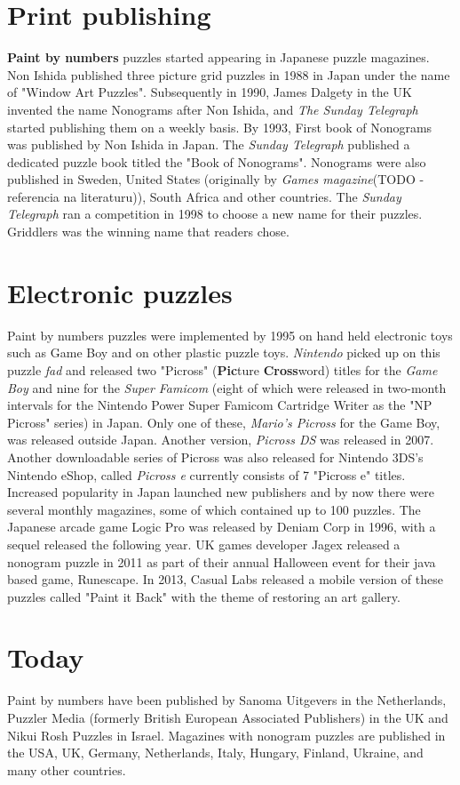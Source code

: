 \section{Print publishing}
\textbf{Paint by numbers} puzzles started appearing in Japanese puzzle magazines. Non Ishida published three picture grid puzzles in 1988 in Japan under the name of "Window Art Puzzles". Subsequently in 1990, James Dalgety in the UK invented the name Nonograms after Non Ishida, and \textit{\textit{The Sunday Telegraph}} started publishing them on a weekly basis. By 1993, First book of Nonograms was published by Non Ishida in Japan. The \textit{Sunday Telegraph} published a dedicated puzzle book titled the "Book of Nonograms". Nonograms were also published in Sweden, United States (originally by \textit{\textit{Games} magazine}(TODO - referencia na literaturu)), South Africa and other countries. The \textit{Sunday Telegraph} ran a competition in 1998 to choose a new name for their puzzles. Griddlers was the winning name that readers chose.
\section{Electronic puzzles}
Paint by numbers puzzles were implemented by 1995 on hand held electronic toys such as Game Boy and on other plastic puzzle toys. \textit{Nintendo} picked up on this puzzle \textit{fad} and released two "Picross" (\textbf{Pic}ture \textbf{Cross}word) titles for the \textit{Game Boy} and nine for the \textit{Super Famicom} (eight of which were released in two-month intervals for the Nintendo Power Super Famicom Cartridge Writer as the "NP Picross" series) in Japan. Only one of these, \textit{\textit{Mario's Picross}} for the Game Boy, was released outside Japan. Another version, \textit{Picross DS} was released in 2007. Another downloadable series of Picross was also released for Nintendo 3DS's Nintendo eShop, called \textit{Picross e} currently consists of 7 "Picross e" titles.  Increased popularity in Japan launched new publishers and by now there were several monthly magazines, some of which contained up to 100 puzzles. The Japanese arcade game Logic Pro was released by Deniam Corp in 1996, with a sequel released the following year. UK games developer Jagex released a nonogram puzzle in 2011 as part of their annual Halloween event for their java based game, Runescape. In 2013, Casual Labs released a mobile version of these puzzles called "Paint it Back" with the theme of restoring an art gallery.
\section{Today}
Paint by numbers have been published by Sanoma Uitgevers in the Netherlands, Puzzler Media (formerly British European Associated Publishers) in the UK and Nikui Rosh Puzzles in Israel. Magazines with nonogram puzzles are published in the USA, UK, Germany, Netherlands, Italy, Hungary, Finland, Ukraine, and many other countries.
